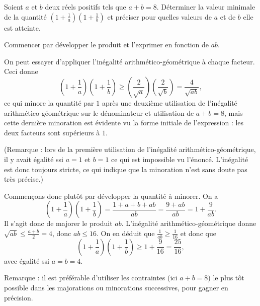 \begin{exo}[Encore un produit]
Soient $a$ et $b$ deux réels positifs tels que $a+b=8$. Déterminer la valeur minimale de la quantité 
$\left(1+\frac1a\right)\left(1+\frac1b\right)$ 
et préciser pour quelles valeurs de $a$ et de $b$ elle est atteinte.
 
\begin{hint}
Commencer par développer le produit et l'exprimer en fonction de $ab$.
\end{hint}

\begin{sol} 
On peut essayer d'appliquer l'inégalité arithmético-géométrique à chaque facteur. Ceci donne
\[ 
\left(1+\frac1a\right)\left(1+\frac1b\right)
\geq 
\left(\frac{2}{\sqrt a}\right)\left(\frac{2}{\sqrt b}\right)
= \frac{4}{\sqrt{ab}},
\]
ce qui minore la quantité par $1$ après une deuxième utilisation de l'inégalité arithmético-géométrique sur le dénominateur et utilisation de $a+b=8$, mais cette dernière minoration est évidente vu la forme initiale de l'expression : les deux facteurs sont supérieurs à $1$.

(Remarque : lors de la première utilisation de l'inégalité arithmético-géométrique, il y avait égalité ssi $a=1$ et $b=1$ ce qui est impossible vu l'énoncé. L'inégalité est donc toujours stricte, ce qui indique que la minoration n'est sans doute pas très précise.)

Commençons donc plutôt par développer la quantité à minorer. On a 
\[ \left(1+\frac1a\right)\left(1+\frac1b\right)
=
\frac{1+a+b+ab}{ab} = \frac{9+ab}{ab} = 1+\frac{9}{ab}.\]
Il s'agit donc de majorer le produit $ab$. L'inégalité arithmético-géométrique donne $\sqrt{ab} \leq \frac{a+b}{2}=4$, donc $ab\leq 16$. On en déduit que $\frac{1}{ab} \geq \frac{1}{16}$ et donc que 
\[
\left(1+\frac1a\right)\left(1+\frac1b\right) \geq 1+\frac{9}{16} = \frac{25}{16},
\]
avec égalité ssi $a=b=4$.

Remarque : il est préférable d'utiliser les contraintes (ici $a+b=8$) le plus tôt possible dans les majorations ou minorations successives, pour gagner en précision.
\end{sol}  
\end{exo}




